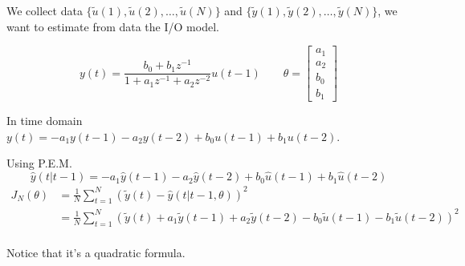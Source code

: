 \begin{example}
    We collect data $\{ \tilde{u}(1), \tilde{u}(2), \dots, \tilde{u}(N) \}$ and $\{ \tilde{y}(1), \tilde{y}(2), \dots, \tilde{y}(N) \}$, we want to estimate from data the I/O model.

    \[
        y(t) = \frac{b_0 + b_1z^{-1}}{1+a_1z^{-1} + a_2z^{-2}}u(t-1) \qquad \theta = \begin{bmatrix}
            a_1 \\ a_2 \\ b_0 \\ b_1
        \end{bmatrix}
    \]

    In time domain $y(t) = -a_1y(t-1)-a_2y(t-2)+b_0u(t-1)+b_1u(t-2)$.

    Using P.E.M.
    \[
        \hat{y}(t|t-1) = -a_1\hat{y}(t-1)-a_2\hat{y}(t-2)+b_0\hat{u}(t-1)+b_1\hat{u}(t-2)
    \]
    \begin{align*}
        J_N(\theta) &= \frac{1}{N}\sum_{t=1}^N \left( \tilde{y}(t) - \hat{y}(t|t-1, \theta) \right)^2 \\
        &= \frac{1}{N}\sum_{t=1}^N \left( \tilde{y}(t) +a_1\tilde{y}(t-1)+a_2\tilde{y}(t-2)-b_0\tilde{u}(t-1)-b_1\tilde{u}(t-2) \right)^2 \\
    \end{align*}

    Notice that it's a quadratic formula.

    \begin{figure}[H]
        \begin{minipage}[t]{0.5\textwidth}
            \centering
\end{minipage}
\end{figure}
\end{example}
